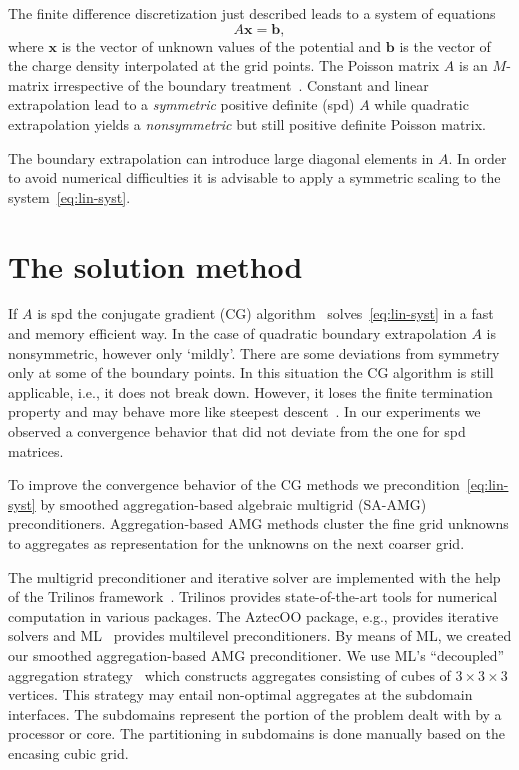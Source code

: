 \documentclass[oribibl]{llncs}
\begin{document}
The finite difference discretization just described leads to a system of
equations
\begin{equation} \label{eq:lin-syst}
  A \mathbf{x} = \mathbf{b},
\end{equation}
where $\mathbf{x}$ is the vector of unknown values of the potential and
$\mathbf{b}$ is the vector of the charge density interpolated at the
grid points.
The Poisson matrix $A$ is an $M$-matrix irrespective of the boundary
treatment~\cite{hack:94}.  Constant and linear extrapolation lead to a
\emph{symmetric} positive definite (spd) $A$ while quadratic extrapolation
yields a \emph{nonsymmetric} but still positive definite Poisson matrix.

The boundary extrapolation can introduce large diagonal elements in
$A$.  In order to avoid numerical difficulties it is advisable to apply
a symmetric scaling to the system~\eqref{eq:lin-syst}.

\section{The solution method}
\label{sec:method}

If $A$ is spd the conjugate gradient (CG)
algorithm~\cite{hack:94,hest:52} solves~\eqref{eq:lin-syst} in a fast
and memory efficient way.
In the case of quadratic boundary extrapolation $A$ is nonsymmetric,
however only `mildly'.  There are some deviations from symmetry only at
some of the boundary points.  In this situation the CG algorithm is
still applicable, i.e., it does not break down.  However, it loses the
finite termination property and may behave more like steepest
descent~\cite{gree:97}.  In our experiments we observed a convergence
behavior that did not deviate from the one for spd matrices.

To improve the convergence behavior of the CG methods we
precondition~\eqref{eq:lin-syst} by smoothed aggregation-based algebraic
multigrid (SA-AMG) preconditioners.  Aggregation-based AMG methods
cluster the fine grid unknowns to aggregates as representation for the
unknowns on the next coarser grid.

The multigrid preconditioner and iterative solver are implemented with
the help of the Trilinos framework~\cite{Trilinos-TOMS,
  Trilinos-Web-Site}.  Trilinos provides state-of-the-art tools for
numerical computation in various packages.  The AztecOO package, e.g.,
provides iterative solvers and ML~\cite{gsht:06} provides multilevel
preconditioners.  By means of ML, we created our smoothed
aggregation-based AMG preconditioner.  We use ML's ``decoupled''
aggregation strategy~\cite{tuto:00} which constructs aggregates
consisting of cubes of $3\!\times\! 3\!\times\! 3$ vertices.  This
strategy may entail non-optimal aggregates at the subdomain interfaces.
The subdomains represent the portion of the problem dealt with by a
processor or core.  The partitioning in subdomains is done manually
based on the encasing cubic grid.
\end{document}
